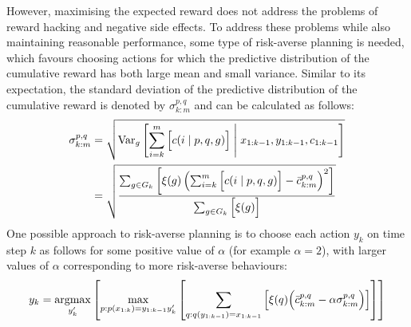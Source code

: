 However, maximising the expected reward does not address the problems of reward hacking and negative side effects. To address these problems while also maintaining reasonable performance, some type of risk-averse planning is needed, which favours choosing actions for which the predictive distribution of the cumulative reward has both large mean and small variance. Similar to its expectation, the standard deviation of the predictive distribution of the cumulative reward is denoted by $\sigma_{k:m}^{p,q}$ and can be calculated as follows:
\begin{align*}
    \sigma_{k:m}^{p,q} &= \sqrt{\text{Var}_g\left[ \sum_{i=k}^{m}{\Bigl[ c(i \mid p, q, g) \Bigr]} \;\middle\vert\; x_{1:k-1}, y_{1:k-1}, c_{1:k-1} \right]} \\
    &= \sqrt{\frac{\sum_{g\in G_k}{\left[ \xi(g) \left(\sum_{i=k}^{m}{\Bigl[ c(i \mid p, q, g) \Bigr]} - \bar{c}_{k:m}^{p,q} \right)^2\right]}}{\sum_{g\in G_k}{\Bigl[ \xi(g) \Bigr]}}}
\end{align*}
One possible approach to risk-averse planning is to choose each action $y_k$ on time step $k$ as follows for some positive value of $\alpha$ (for example $\alpha=2$), with larger values of $\alpha$ corresponding to more risk-averse behaviours:
\begin{equation*}
    y_k = \underset{y_k'}{\operatorname{argmax}}\left[ \max_{p:p(x_{1:k})=y_{1:k-1}y_k'}\left[ \sum_{q:q(y_{1:k-1})=x_{1:k-1}}{\left[ \xi(q) \Bigl( \bar{c}_{k:m}^{p,q} - \alpha \sigma_{k:m}^{p,q} \Bigr) \right]} \right] \right]
\end{equation*}
